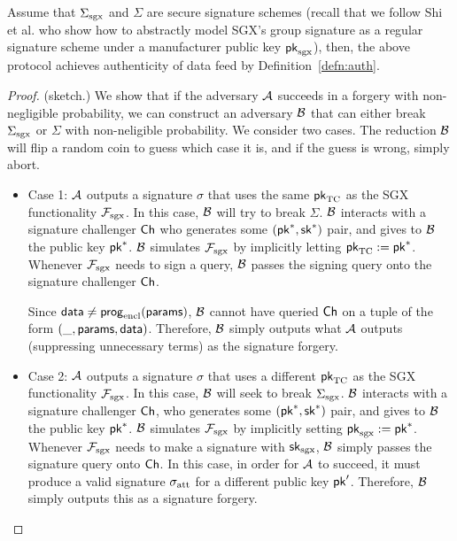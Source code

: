\begin{theorem}[Authenticity]
Assume that ${\Sigma_{\textrm{sgx}}}$
and $\Sigma$ are secure signature schemes (recall
that we follow Shi et al.  who show
how to abstractly  
model SGX's group signature as a regular signature
scheme under a manufacturer public key ${\sf pk}_{\mathrm{sgx}}$),
then, the above 
protocol achieves authenticity of data feed by Definition~\ref{defn:auth}.
\end{theorem}
\begin{proof} (sketch.)
We show that if the 
adversary $\mathcal{A}$ succeeds in a forgery with non-negligible probability,
we can construct an adversary $\mathcal{B}$ that can either
break ${\Sigma_{\textrm{sgx}}}$ or $\Sigma$ with non-neligible probability.
We consider two cases. 
The reduction $\mathcal{B}$ will flip a random coin to guess which
case it is, and if the guess is wrong, simply abort.
\begin{itemize}[leftmargin=5mm]
\item
Case 1: $\mathcal{A}$ outputs a signature $\sigma$ that uses the same  
${\sf pk}_{\textrm{TC}}$ as the SGX functionality $\mathcal{F}_{\textrm{sgx}}$.
In this case, $\mathcal{B}$ will try to break $\Sigma$. 
$\mathcal{B}$ interacts with a signature challenger ${\sf Ch}$ who generates
some $({\sf pk}^*, {\sf sk}^*)$ pair, and gives to $\mathcal{B}$ the public key
${\sf pk}^*$. $\mathcal{B}$ simulates 
$\mathcal{F}_{\textrm{sgx}}$ by implicitly letting ${\sf pk}_{\textrm{TC}} := {\sf pk}^*$.
Whenever $\mathcal{F}_{\textrm{sgx}}$ needs to sign a query, $\mathcal{B}$ passes the signing query
onto the signature challenger ${\sf Ch}$.

Since ${\sf data} \neq {\sf prog}_{\textrm{encl}}({\sf params})$,
$\mathcal{B}$ cannot have queried ${\sf Ch}$  
on a tuple of the form $(\_, {\sf params}, {\sf data})$. 
Therefore, $\mathcal{B}$ simply outputs 
what $\mathcal{A}$ 
outputs (suppressing unnecessary terms) as the signature forgery. 

\item
Case 2:
 $\mathcal{A}$ outputs a signature $\sigma$ that uses a different 
${\sf pk}_{\textrm{TC}}$ as the SGX functionality $\mathcal{F}_{\textrm{sgx}}$.
In this case, $\mathcal{B}$ will seek to break ${\Sigma_{\textrm{sgx}}}$.
$\mathcal{B}$ interacts with a signature challenger ${\sf Ch}$, who generates
some $({\sf pk}^*, {\sf sk}^*)$ pair, and gives to $\mathcal{B}$ the public key
${\sf pk}^*$. $\mathcal{B}$ simulates $\mathcal{F}_{\textrm{sgx}}$ by implicitly setting
${\sf pk}_{\mathrm{sgx}} := {\sf pk}^*$.
Whenever $\mathcal{F}_{\textrm{sgx}}$ needs to make a signature
with ${\sf sk}_{\mathrm{sgx}}$, 
$\mathcal{B}$ simply passes the signature query onto ${\sf Ch}$.
In this case, in order for $\mathcal{A}$ to succeed,
it must produce a valid signature ${\sigma_{\textrm{att}}}$ 
for a different public key ${\sf pk}'$.
Therefore, $\mathcal{B}$ simply outputs this as a signature forgery.
\end{itemize}
\end{proof}



